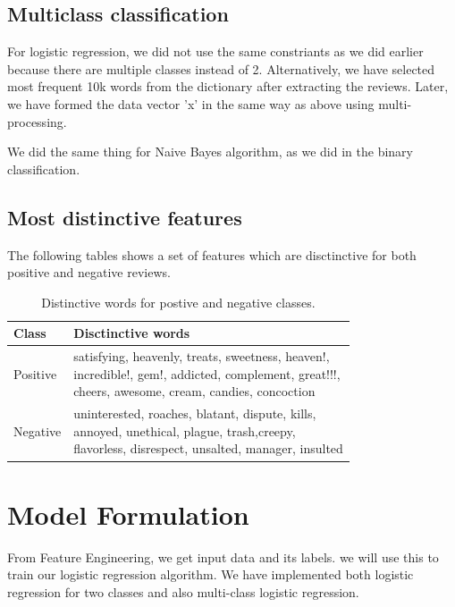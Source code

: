 \documentclass{article}
\begin{document}
\subsection{Multiclass classification}

For logistic regression, we did not use the same constriants as we did earlier because there are multiple classes instead of 2. Alternatively, we have selected most frequent 10k words from the dictionary after extracting the reviews. Later, we have formed the data vector 'x' in the same way as above using multi-processing.   

We did the same thing for Naive Bayes algorithm, as we did in the binary classification.


\subsection{Most distinctive features}
The following tables shows a set of features which are disctinctive for both positive and negative reviews.
\begin{table}[H]
\caption{Distinctive words for postive and negative classes.}
\label{sample-table}
\begin{small}
\begin{sc}
\begin{adjustbox}{width=0.5\textwidth}
\begin{tabular}{l|l}
\hline
Class &  Disctinctive words\\
\hline
Positive  &  \pbox{20cm}{satisfying, heavenly, treats, sweetness, heaven!, \\incredible!, gem!, addicted, complement, great!!!,\\ cheers, awesome, cream, candies, concoction}\\
\hline
Negative  &  \pbox{20cm}{uninterested, roaches, blatant, dispute, kills,\\ annoyed, unethical, plague, trash,creepy,\\ flavorless, disrespect, unsalted, manager, insulted}\\
\hline
\end{tabular}
\end{adjustbox}
\end{sc}
\end{small}
\end{table}


\section{Model Formulation}
From Feature Engineering, we get input data and its labels. we will use this to train our logistic regression algorithm. We have implemented both logistic regression for two classes and also multi-class logistic regression.
\end{document}
